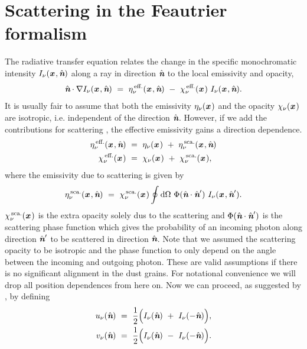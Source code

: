 \documentclass[a4paper,fleqn,usenatbib]{mnras}
\newcommand{\D}{\text{d}}
\newcommand{\x}{{\textit{\textbf{x}}}\,}
\newcommand{\n}{\hat{\textit{\textbf{n}}}}
\begin{document}
\section{Scattering in the Feautrier formalism}
\label{Scattering}

The radiative transfer equation relates the change in the specific monochromatic intensity $I_{\nu}(\x,\n)$ along a ray in direction $\n$ to the local emissivity and opacity,
\begin{equation}
	\n \cdot \nabla I_{\nu}(\x,\n) \ = \ \eta^{\,\text{eff.}}_{\nu}(\x,\n) \ - \ \chi^{\,\text{eff.}}_{\nu}(\x) \ I_{\nu}(\x,\n).
\label{transfer}
\end{equation}
It is usually fair to assume that both the emissivity $\eta_{\nu}(\x)$ and the opacity $\chi_{\nu}(\x)$ are isotropic, i.e. independent of the direction $\n$. However, if we add the contributions for scattering \citep[see e.g.][]{Steinacker2013}, the effective emissivity gains a direction dependence.
\begin{equation}
\begin{split}
		\eta^{\,\text{eff.}}_{\nu}(\x,\n) \ &= \ \eta_{\nu}(\x) \ + \ \eta^{\,\text{sca.}}_{\nu}(\x,\n) \\
		\chi^{\,\text{eff.}}_{\nu}(\x)   \ &= \ \chi_{\nu}(\x) \ + \ \chi^{\,\text{sca.}}_{\nu}(\x),
\end{split}
\label{scattering}
\end{equation}
where the emissivity due to scattering is given by
\begin{equation}
	\eta^{\,\text{sca.}}_{\nu}(\x,\n) \ = \ \chi^{\,\text{sca.}}_{\nu}(\x) \oint \D\Omega \ \Phi(\n\cdot\n') \ I_{\nu}(\x,\n').
\label{etasca}
\end{equation}
$\chi^{\,\text{sca.}}_{\nu}(\x)$ is the extra opacity solely dus to the scattering and $\Phi(\n\cdot\n')$ is the scattering phase function which gives the probability of an incoming photon along direction $\n'$ to be scattered in direction $\n$. Note that we assumed the scattering opacity to be isotropic and the phase function to only depend on the angle between the incoming and outgoing photon. These are valid assumptions if there is no significant alignment in the dust grains. For notational convenience we will drop all position dependences from here on. Now we can proceed, as suggested by \citet{Feautrier1964}, by defining
\begin{equation}
\begin{split}
		u_{\nu}(\n) \ &= \ \frac{1}{2}\Big( I_{\nu}(\n) \ + \ I_{\nu}(-\n) \Big), \\
		v_{\nu}(\n) \ &= \ \frac{1}{2}\Big( I_{\nu}(\n) \ - \ I_{\nu}(-\n) \Big).
\end{split}
\end{equation}
\end{document}
